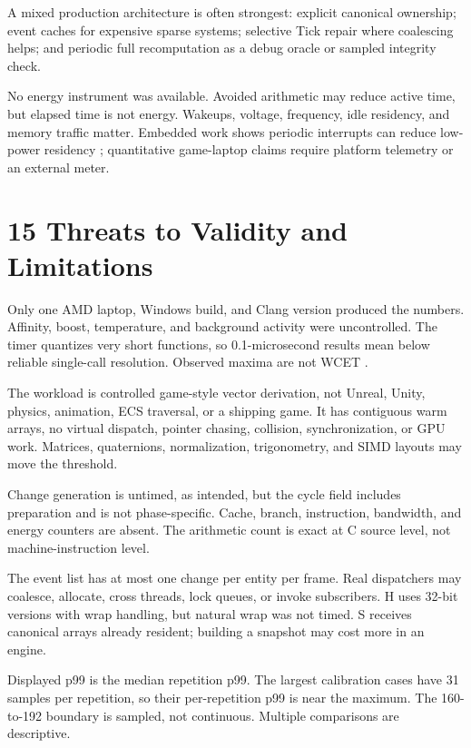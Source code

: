 A mixed production architecture is often strongest: explicit canonical ownership; event caches for expensive sparse systems; selective Tick repair where coalescing helps; and periodic full recomputation as a debug oracle or sampled integrity check.

No energy instrument was available. Avoided arithmetic may reduce active time, but elapsed time is not energy. Wakeups, voltage, frequency, idle residency, and memory traffic matter. Embedded work shows periodic interrupts can reduce low-power residency \cite{zeng2008}; quantitative game-laptop claims require platform telemetry or an external meter.

\section{15 Threats to Validity and Limitations}

Only one AMD laptop, Windows build, and Clang version produced the numbers. Affinity, boost, temperature, and background activity were uncontrolled. The timer quantizes very short functions, so 0.1-microsecond results mean below reliable single-call resolution. Observed maxima are not WCET \cite{wilhelm2008}.

The workload is controlled game-style vector derivation, not Unreal, Unity, physics, animation, ECS traversal, or a shipping game. It has contiguous warm arrays, no virtual dispatch, pointer chasing, collision, synchronization, or GPU work. Matrices, quaternions, normalization, trigonometry, and SIMD layouts may move the threshold.

Change generation is untimed, as intended, but the cycle field includes preparation and is not phase-specific. Cache, branch, instruction, bandwidth, and energy counters are absent. The arithmetic count is exact at C source level, not machine-instruction level.

The event list has at most one change per entity per frame. Real dispatchers may coalesce, allocate, cross threads, lock queues, or invoke subscribers. H uses 32-bit versions with wrap handling, but natural wrap was not timed. S receives canonical arrays already resident; building a snapshot may cost more in an engine.

Displayed p99 is the median repetition p99. The largest calibration cases have 31 samples per repetition, so their per-repetition p99 is near the maximum. The 160-to-192 boundary is sampled, not continuous. Multiple comparisons are descriptive.

